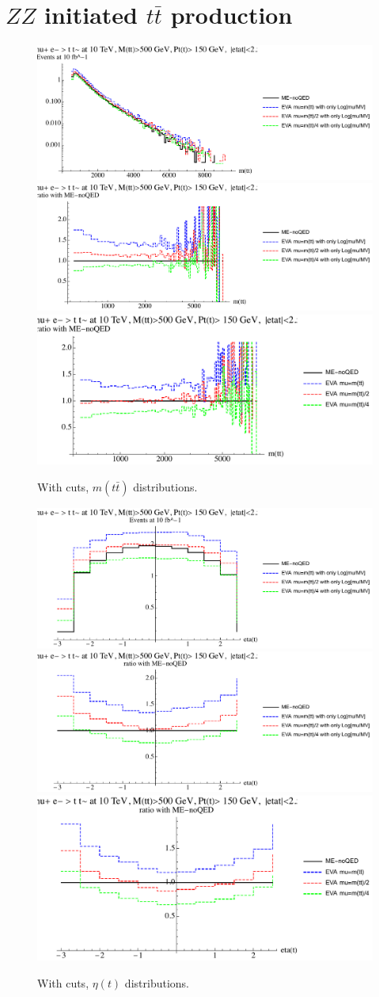\documentclass[a4paper,11pt]{article}
\begin{document}
 
\clearpage

\section{$ZZ$ initiated $t \bar t$ production}

\begin{figure}[!t]
\includegraphics[width=0.46\linewidth]{Notebooks/PlotDistr/ZZ_tt/10TeVcuts/plotmtt.pdf}
\includegraphics[width=0.46\linewidth]{Notebooks/PlotDistr/ZZ_tt/10TeVcuts/plotmttratio1.pdf}
\includegraphics[width=0.46\linewidth]{Notebooks/PlotDistr/ZZ_tt/10TeVcuts/plotmttratio2.pdf}
\caption{With cuts, $m(t \bar t)$ distributions. \label{fig:cutsZZtt}}
\end{figure}


\begin{figure}[!t]
\includegraphics[width=0.46\linewidth]{Notebooks/PlotDistr/ZZ_tt/10TeVcuts/plotetat.pdf}
\includegraphics[width=0.46\linewidth]{Notebooks/PlotDistr/ZZ_tt/10TeVcuts/plotetatratio1.pdf}
\includegraphics[width=0.46\linewidth]{Notebooks/PlotDistr/ZZ_tt/10TeVcuts/plotetatratio2.pdf}
\caption{With cuts, $\eta(t)$ distributions. \label{fig:cutsZZtt2}}
\end{figure}
\end{document}
